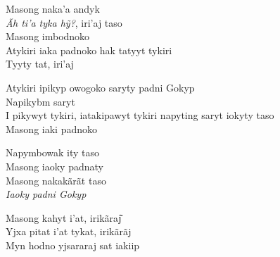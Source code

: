 \bigskip

\begin{linenumbers}\begingroup\raggedright
\noindent Masong naka'a andyk\\
\emph{Ãh ti'a tyka hỹ?}, iri'aj taso\\
Masong imbodnoko\\
Atykiri iaka padnoko hak tatyyt tykiri\\
Tyyty tat, iri'aj
\end{linenumbers}\endgroup

\bigskip

\begin{linenumbers}\begingroup\raggedright
\noindent Atykiri ipikyp owogoko saryty padni Gokyp\\
Napikybm saryt\\
I pikywyt tykiri, iatakipawyt tykiri napyting saryt iokyty taso\\
Masong iaki padnoko
\end{linenumbers}\endgroup

\bigskip

\begin{linenumbers}\begingroup\raggedright
\noindent Napymbowak ity taso\\
Masong iaoky padnaty\\
Masong nakakãrãt taso\\
\emph{Iaoky padni Gokyp}
\end{linenumbers}\endgroup

\bigskip

\begin{linenumbers}\begingroup\raggedright
\noindent Masong kahyt i'at, irikãraj͂\\
Yjxa pitat i'at tykat, irikãrãj\\
Myn hodno yjsararaj sat iakiip
\end{linenumbers}\endgroup

